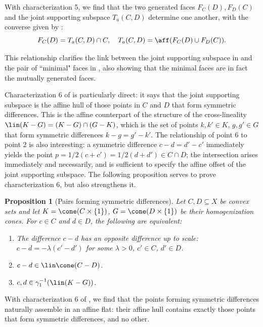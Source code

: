\documentclass{article}
\theoremstyle{plain}
\newtheorem{proposition}[proposition]{Proposition}
\theoremstyle{definition}
\theoremstyle{remark}
\begin{document}
With characterization 5, we find that the two generated faces $F_C(D),  F_D(C)$ and the joint supporting subspace $T_a(C, D)$ determine one another, with the converse given by :
\begin{equation*}
F_C(D) =  T_a(C, D) \cap C,  \quad T_a(C, D) =  \aff(F_C(D) \cup  F_D(C)).
\end{equation*}

This relationship clarifies the link between the joint supporting subspace in \cite{scottBilateralFacialReduction2026} and the pair of ``minimal" faces in \cite{linFacialReductionNice2025}, also showing that the minimal faces are in fact the mutually generated faces.

Characterization 6 of  is particularly direct: it says that the joint supporting subspace
is the affine hull of those points in $C$ and $D$ that form symmetric differences. This is the affine counterpart of the structure of the cross-lineality $\lin(K-G)= (K-G) \cap (G-K)$, which is the set of points $k,k' \in K$, $g,g' \in G$ that form symmetric differences $k-g=g'-k'$.
The relationship of point 6 to point 2 is also interesting: a symmetric difference $c-d = d'-c'$ immediately yields the point $p = 1/2(c + c') = 1/2(d + d') \in C \cap D$; the intersection arises immediately and necessarily, and is sufficient to specify the affine offset of the joint supporting subspace.
The following proposition serves to prove characterization 6, but also strengthens it.
\begin{proposition}[Pairs forming symmetric differences]
\label{loc:pairs_forming_symmetric_differences.statement}
Let $C, D \subseteq X$ be convex sets and let $K = \cone(C \times \{1\})$, $G = \cone(D \times \{1\})$ be their homogenization cones. For $c \in C$ and $d \in D$, the following are equivalent:
\begin{enumerate}
\item The difference $c-d$ has an opposite difference up to scale: $c - d = -\lambda(c'-d')$ for some $\lambda > 0$, $c' \in C$, $d' \in D$.
\item $c - d \in \lin\cone(C-D)$.
\item $c, d \in \gamma_1^{-1}(\lin(K-G))$.
\end{enumerate}
\end{proposition}
With characterization 6 of , we find that the points forming symmetric differences naturally assemble in an affine flat: their affine hull contains exactly those points that form symmetric differences, and no other.
\end{document}
